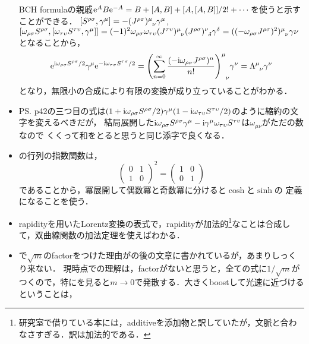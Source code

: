 \begin{itemize}
		BCH formulaの親戚$\mathrm{e}^{A}B\mathrm{e}^{-A} = B + [A, B] + [A, [A, B]]/2!  + \cdots$を使うと示すことができる．
		$[S^{\rho\sigma}, \gamma^{\mu}] = -(J^{\rho\sigma})\indices{^\mu_\nu}\gamma^{\mu}$, 
		$[\omega_{\rho\sigma}S^{\rho\sigma},[\omega_{\tau\upsilon}S^{\tau\upsilon}, \gamma^{\mu}]] \allowbreak = (-1)^2\omega_{\rho\sigma}\omega_{\tau\upsilon}(J^{\tau\upsilon})\indices{^\mu_\nu}(J^{\rho\sigma})\indices{^\nu_\delta}\gamma^{\delta} = ((-\omega_{\rho\sigma}J^{\rho\sigma})^2)\indices{^\mu_\nu}\gamma{\nu}$
		となることから，
		\begin{equation}
			\e^{\i\omega_{\rho\sigma}S^{\rho\sigma}/2}\gamma^{\mu}\e^{-\i\omega_{\tau\sigma}S^{\tau\sigma}/2} = \qty(\sum_{n=0}^{\infty}\frac{(-\i\omega_{\rho\sigma }J^{\rho\sigma})^n}{n!})\indices{^\mu_\nu}\gamma^{\nu}
			= \Lambda\indices{^\mu_\nu}\gamma^{\nu}
		\end{equation}
		となり，無限小の合成により有限の変換が成り立っていることがわかる．
	\item PS. p42の三つ目の式は$(1+\mathrm{i}\omega_{\rho\sigma}S^{\rho\sigma}/2)\gamma^{\mu}(1-\mathrm{i}\omega_{\tau\upsilon}S^{\tau\upsilon}/2)$のように縮約の文字を変えるべきだが，
	結局展開した$\mathrm{i}\omega_{\rho\sigma}S^{\rho\sigma}\gamma^{\mu}-\mathrm{i}\gamma^{\mu}\omega_{\tau\upsilon}S^{\tau\upsilon}$は$\omega_{\mu\nu}$がただの数なので
	くくって和をとると思うと同じ添字で良くなる．
	\item {}の行列の指数関数は，
		\begin{equation}
			\begin{pmatrix}
				0 & 1\\
				1 & 0
			\end{pmatrix}^2 = 
			\begin{pmatrix}
				1 & 0\\
				0 &1
			\end{pmatrix}
		\end{equation}
		であることから，冪展開して偶数冪と奇数冪に分けると$\cosh$と$\sinh$の
		定義になることを使う．
	\item rapidityを用いたLorentz変換の表式で，rapidityが加法的\footnote{研究室で借りている本には，additiveを添加物と訳していたが，文脈と合わなさすぎる．訳は加法的である．}なことは合成して，双曲線関数の加法定理を使えばわかる．
	\item {}で$\sqrt{m}$のfactorをつけた理由がの後の文章に書かれているが，あまりしっくり来ない．
		現時点での理解は，factorがないと思うと，全ての式に$1/\sqrt{m}$がつくので，特にを見ると$m\to0$で発散する．大きくboostして光速に近づけるということは，

\end{itemize}

